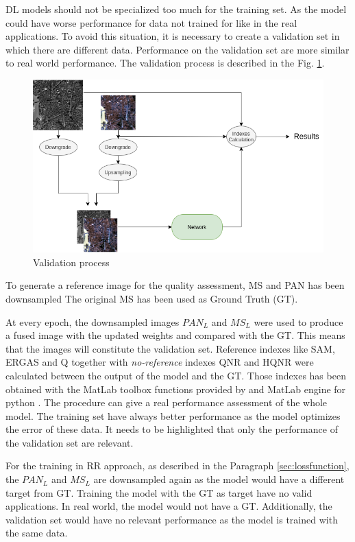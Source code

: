 \documentclass[12pt]{report}
\begin{document}
DL models should not be specialized too much for the training set.
As the model could have worse performance for data not trained for like in the real applications.
To avoid this situation, it is necessary to create a validation set in which there are different data. 
Performance on the validation set are more similar to real world performance.
The validation process is described in the Fig. \ref{fig:validation}.

\begin{figure}[t]
    \centering
    \includegraphics[scale=.5]{validation.png}
    \caption{Validation process}
    \label{fig:validation}
\end{figure}

To generate a reference image for the quality assessment, MS and PAN has been downsampled
The original MS has been used as Ground Truth (GT).

At every epoch, the downsampled images $PAN_L$ and $MS_L$ were used 
to produce a fused image with the updated weights and compared with the GT.
This means that the images will constitute the validation set. 
Reference indexes like SAM, ERGAS and Q together with \textit{no-reference} indexes QNR and HQNR were calculated between the output of the model and the GT.
Those indexes has been obtained with the MatLab toolbox functions provided by \cite{criticalComparison} and MatLab engine 
for python \cite{matlab}.
The procedure can give a real performance assessment of the whole model.
The training set have always better performance as the model optimizes the 
error of these data. It needs to be highlighted that only the performance of the validation set are relevant. 

For the training in RR approach, as described in the Paragraph \ref{sec:lossfunction}, the $PAN_L$ and $MS_L$ are downsampled again as the model
would have a different target from GT.
Training the model with the GT as target have no valid applications.
In real world, the model would not have a GT.
Additionally, the validation set would have no relevant performance as the model is trained with the same data.
\end{document}
